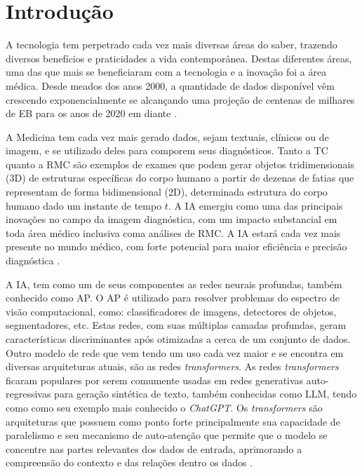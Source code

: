 \chapter{Introdução}
\label{chap:intro}

A tecnologia tem perpetrado cada vez mais diversas áreas do saber, trazendo diversos benefícios e praticidades a vida contemporânea. Destas diferentes áreas, uma das que mais se beneficiaram com a tecnologia e a inovação foi a área médica. Desde meados dos anos 2000, a quantidade de dados disponível vêm crescendo exponencialmente se alcançando uma projeção de centenas de milhares de \gls{EB} para os anos de 2020 em diante \cite{gantzDIGITALUNIVERSE2020}.

A Medicina tem cada vez mais gerado dados, sejam textuais, clínicos ou de imagem, e se utilizado deles para comporem seus diagnósticos. Tanto a \gls{TC} quanto a \gls{RMC} são exemplos de exames que podem gerar objetos tridimensionais (3D) de estruturas específicas do corpo humano a partir de dezenas de fatias que representam de forma bidimensional (2D), determinada estrutura do corpo humano dado um instante de tempo $t$. A \gls{IA} emergiu como uma das principais inovações no campo da imagem diagnóstica, com um impacto substancial em toda área médico inclusiva coma análises de \gls{RMC}. A \gls{IA} estará cada vez mais presente no mundo médico, com forte potencial para maior eficiência e precisão diagnóstica \cite{argentieroApplicationsArtificialIntelligence2022}.


A IA, tem como um de seus componentes as redes neurais profundas, também conhecido como \gls{AP}. O \gls{AP} é utilizado para resolver problemas do espectro de visão computacional, como: classificadores de imagens, detectores de objetos, segmentadores, etc. Estas redes, com suas múltiplas camadas profundas, geram características discriminantes após otimizadas a cerca de um conjunto de dados. Outro modelo de rede que vem tendo um uso cada vez maior e se encontra em diversas arquiteturas atuais, são as redes \textit{transformers}. As redes \textit{transformers} ficaram populares por serem comumente usadas em redes generativas auto-regressivas para geração sintética de texto, também conhecidas como \gls{LLM}, tendo como como seu exemplo mais conhecido o \textit{ChatGPT}. Os \textit{transformers} são arquiteturas que possuem como ponto forte principalmente sua capacidade de paralelismo e seu mecanismo de auto-atenção que permite que o modelo se concentre nas partes relevantes dos dados de entrada, aprimorando a compreensão do contexto e das relações dentro os dados \cite{russell2020artificial}.

